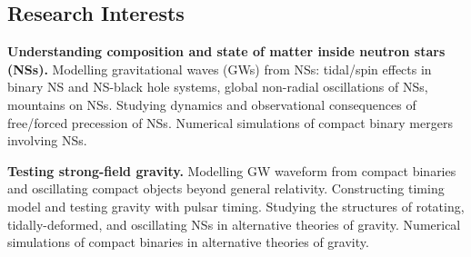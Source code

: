 \documentclass[margin,line]{res}
\begin{document}
\begin{resume}
\section{\sc Research Interests}

{\bf Understanding composition and state of matter inside neutron stars (NSs).} Modelling gravitational waves (GWs) from NSs: tidal/spin effects in binary NS and NS-black hole systems, global non-radial oscillations of NSs, mountains on NSs. Studying dynamics and observational consequences of free/forced precession of NSs. Numerical simulations of compact binary mergers involving NSs.

{\bf Testing strong-field gravity.} Modelling GW waveform from compact binaries and oscillating compact objects beyond general relativity. Constructing timing model and testing gravity with pulsar timing. Studying the structures of rotating, tidally-deformed, and oscillating NSs in alternative theories of gravity. Numerical simulations of compact binaries in alternative theories of gravity.




\end{resume}
\end{document}
